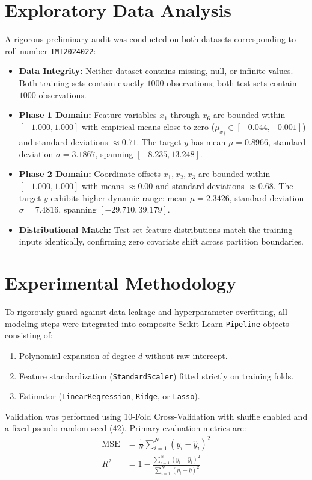 \documentclass[10pt,twocolumn]{article}
\begin{document}
\section{Exploratory Data Analysis}
A rigorous preliminary audit was conducted on both datasets corresponding to roll number \texttt{IMT2024022}:
\begin{itemize}\setlength{\itemsep}{1pt}
    \item \textbf{Data Integrity:} Neither dataset contains missing, null, or infinite values. Both training sets contain exactly $1000$ observations; both test sets contain $1000$ observations.
    \item \textbf{Phase 1 Domain:} Feature variables $x_1$ through $x_6$ are bounded within $[-1.000, 1.000]$ with empirical means close to zero ($\mu_{x_j} \in [-0.044, -0.001]$) and standard deviations $\approx 0.71$. The target $y$ has mean $\mu = 0.8966$, standard deviation $\sigma = 3.1867$, spanning $[-8.235, 13.248]$.
    \item \textbf{Phase 2 Domain:} Coordinate offsets $x_1, x_2, x_3$ are bounded within $[-1.000, 1.000]$ with means $\approx 0.00$ and standard deviations $\approx 0.68$. The target $y$ exhibits higher dynamic range: mean $\mu = 2.3426$, standard deviation $\sigma = 7.4816$, spanning $[-29.710, 39.179]$.
    \item \textbf{Distributional Match:} Test set feature distributions match the training inputs identically, confirming zero covariate shift across partition boundaries.
\end{itemize}

\section{Experimental Methodology}
To rigorously guard against data leakage and hyperparameter overfitting, all modeling steps were integrated into composite Scikit-Learn \texttt{Pipeline} objects consisting of:
\begin{enumerate}\setlength{\itemsep}{1pt}
    \item Polynomial expansion of degree $d$ without raw intercept.
    \item Feature standardization (\texttt{StandardScaler}) fitted strictly on training folds.
    \item Estimator (\texttt{LinearRegression}, \texttt{Ridge}, or \texttt{Lasso}).
\end{enumerate}

Validation was performed using 10-Fold Cross-Validation with shuffle enabled and a fixed pseudo-random seed ($42$). Primary evaluation metrics are:
\begin{align}
\text{MSE} &= \frac{1}{N} \sum_{i=1}^N (y_i - \hat{y}_i)^2 \\
R^2 &= 1 - \frac{\sum_{i=1}^N (y_i - \hat{y}_i)^2}{\sum_{i=1}^N (y_i - \bar{y})^2}
\end{align}
\end{document}
